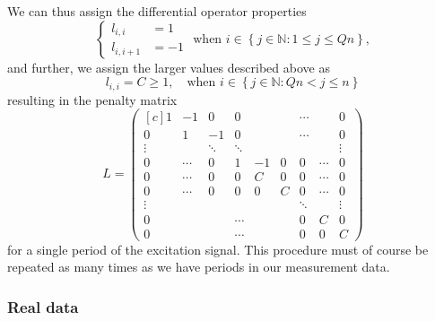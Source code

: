 \documentclass[12pt,a4]{article}
\newcommand{\N}{{\mathbb N}}
\begin{document}
We can thus assign the differential operator properties
\begin{equation*}
\begin{cases}
 l_{i,i}   &= 1 \\
 l_{i,i+1} &= -1 
\end{cases}
\text{ when } i \in \left\{ j \in \N : 1 \leq j \leq Qn \right\} ,
\end{equation*}
and further, we assign the larger values described above as
\begin{equation*}
 l_{i,i} = C \geq 1, \quad \text{when } i \in \left\{ j \in \N : Qn < j \leq n \right\}
\end{equation*}
resulting in the penalty matrix
\begin{equation}
L=
\begin{pmatrix*}[c]
 1      & -1     &  0     & 0       &    &    & \cdots  &        & 0       \\
 0      & 1      & -1     & 0       &    &    & \cdots  &        & 0       \\
 \vdots &        & \ddots & \ddots  &    &    &         &        & \vdots  \\
 0      & \cdots &  0     & 1       & -1 & 0  & 0       & \cdots & 0       \\
 0      & \cdots &  0     & 0       & C  & 0  & 0       & \cdots & 0       \\
 0      & \cdots &  0     & 0       & 0  & C  & 0       & \cdots & 0       \\
 \vdots &        &        &         &    &    & \ddots  &        & \vdots  \\
 0      &        &        & \cdots  &    &    &  0      &  C     & 0       \\
 0      &        &        & \cdots  &    &    &  0      &  0     & C 
\end{pmatrix*}
\end{equation}
for a single period of the excitation signal. This procedure must of course be repeated as many times as we have periods in our measurement data.

\subsubsection{Real data}
\label{sec:realData}
\end{document}
